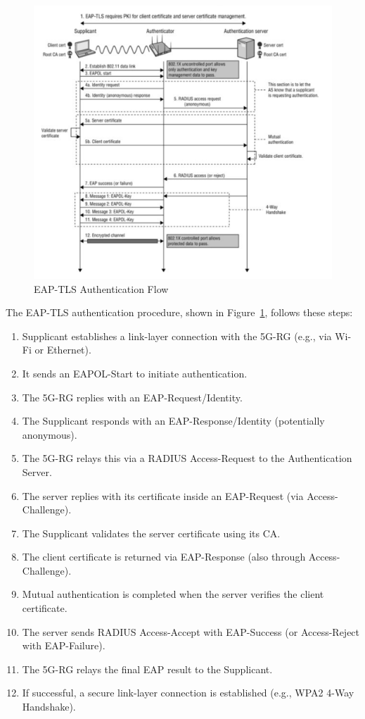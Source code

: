 \begin{figure}
    \centering
    \includegraphics[width=0.75\linewidth]{figs/eap-tls-auth-flow.png}
    \caption{\ac{EAP-TLS} Authentication Flow}
    \label{fig:eap-tls-auth-flow}
\end{figure}

The \ac{EAP-TLS} authentication procedure, shown in Figure~\ref{fig:eap-tls-auth-flow}, follows these steps:

\begin{enumerate}
    \item Supplicant establishes a link-layer connection with the \ac{5G-RG} (e.g., via Wi-Fi or Ethernet).
    \item It sends an \ac{EAPOL}-Start to initiate authentication.
    \item The \ac{5G-RG} replies with an \ac{EAP}-Request/Identity.
    \item The Supplicant responds with an \ac{EAP}-Response/Identity (potentially anonymous).
    \item The \ac{5G-RG} relays this via a \ac{RADIUS} Access-Request to the Authentication Server.
    \item The server replies with its certificate inside an \ac{EAP}-Request (via Access-Challenge).
    \item The Supplicant validates the server certificate using its \ac{CA}.
    \item The client certificate is returned via \ac{EAP}-Response (also through Access-Challenge).
    \item Mutual authentication is completed when the server verifies the client certificate.
    \item The server sends \ac{RADIUS} Access-Accept with \ac{EAP}-Success (or Access-Reject with \ac{EAP}-Failure).
    \item The \ac{5G-RG} relays the final \ac{EAP} result to the Supplicant.
    \item If successful, a secure link-layer connection is established (e.g., \ac{WPA}2 4-Way Handshake).
\end{enumerate}

